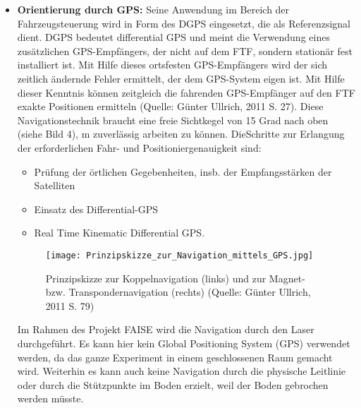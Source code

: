 \begin{itemize}
	\item \textbf{Orientierung durch GPS:} Seine Anwendung im Bereich der Fahrzeugsteuerung wird in Form des DGPS eingesetzt, die als Referenzsignal dient. DGPS bedeutet differential GPS und meint die Verwendung eines zus\"atzlichen GPS-Empf\"angers, der nicht auf dem FTF, sondern station\"ar fest installiert ist. Mit Hilfe dieses ortsfesten GPS-Empf\"angers wird der sich zeitlich \"andernde Fehler ermittelt, der dem GPS-System eigen ist. Mit Hilfe dieser Kenntnis k\"onnen zeitgleich die fahrenden GPS-Empf\"anger auf den FTF exakte Positionen ermitteln (Quelle: G\"unter Ullrich, 2011 S. 27). Diese Navigationstechnik braucht eine freie Sichtkegel von 15 Grad  nach oben (siehe Bild 4), m zuverl\"assig arbeiten zu k\"onnen. DieSchritte zur Erlangung der erforderlichen Fahr- und Positioniergenauigkeit sind:
	\begin{itemize}
		\item Pr\"ufung der \"ortlichen Gegebenheiten, insb. der Empfangsst\"arken der Satelliten
 \item Einsatz des Differential-GPS
 \item Real Time Kinematic Differential GPS. 
\end{itemize}
	\begin{figure}[h!]
		\centering
		\texttt{[image: Prinzipskizze\_zur\_Navigation\_mittels\_GPS.jpg]}
		\caption{Prinzipskizze zur Koppelnavigation (links) und zur Magnet- bzw. Transpondernavigation (rechts) (Quelle: G\"unter Ullrich, 2011 S. 79)}
		\label{Systemarchitektur_FTS}
\end{figure}
Im Rahmen des Projekt FAISE wird die Navigation durch den Laser durchgef\"uhrt. Es kann hier kein Global Positioning System (GPS) verwendet werden, da das ganze Experiment in einem geschlossenen Raum gemacht wird. Weiterhin es kann auch keine Navigation durch die physische Leitlinie oder durch die St\"utzpunkte im Boden erzielt, weil der Boden gebrochen werden m\"usste.
\end{itemize}

